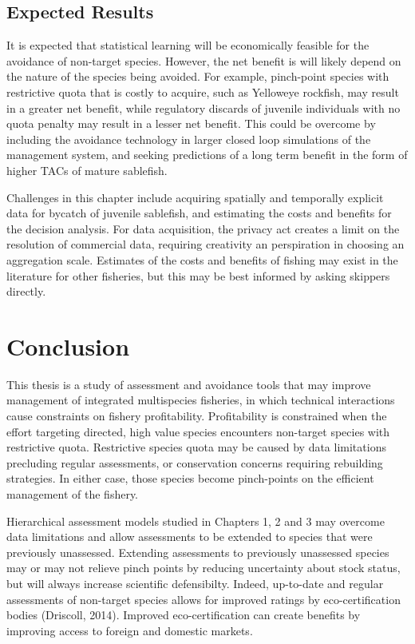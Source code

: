 \documentclass[12pt,]{scrartcl}
\begin{document}
\subsection{Expected Results}\label{expected-results-3}

It is expected that statistical learning will be economically feasible
for the avoidance of non-target species. However, the net benefit is
will likely depend on the nature of the species being avoided. For
example, pinch-point species with restrictive quota that is costly to
acquire, such as Yelloweye rockfish, may result in a greater net
benefit, while regulatory discards of juvenile individuals with no quota
penalty may result in a lesser net benefit. This could be overcome by
including the avoidance technology in larger closed loop simulations of
the management system, and seeking predictions of a long term benefit in
the form of higher TACs of mature sablefish.

Challenges in this chapter include acquiring spatially and temporally
explicit data for bycatch of juvenile sablefish, and estimating the
costs and benefits for the decision analysis. For data acquisition, the
privacy act creates a limit on the resolution of commercial data,
requiring creativity an perspiration in choosing an aggregation scale.
Estimates of the costs and benefits of fishing may exist in the
literature for other fisheries, but this may be best informed by asking
skippers directly.

\section{Conclusion}\label{conclusion}

This thesis is a study of assessment and avoidance tools that may
improve management of integrated multispecies fisheries, in which
technical interactions cause constraints on fishery profitability.
Profitability is constrained when the effort targeting directed, high
value species encounters non-target species with restrictive quota.
Restrictive species quota may be caused by data limitations precluding
regular assessments, or conservation concerns requiring rebuilding
strategies. In either case, those species become pinch-points on the
efficient management of the fishery.

Hierarchical assessment models studied in Chapters 1, 2 and 3 may
overcome data limitations and allow assessments to be extended to
species that were previously unassessed. Extending assessments to
previously unassessed species may or may not relieve pinch points by
reducing uncertainty about stock status, but will always increase
scientific defensibilty. Indeed, up-to-date and regular assessments of
non-target species allows for improved ratings by eco-certification
bodies (Driscoll, 2014). Improved eco-certification can create benefits
by improving access to foreign and domestic markets.
\end{document}
